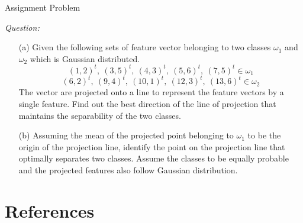 \begin{frame}{Assignment Problem}
\begin{footnotesize}
\textit{\color{mycolor2}Question:}
\begin{itemize}
\item[(a)] Given the following sets of feature vector belonging to two classes $\omega_1$ and $\omega_2$ which is Gaussian distributed.
\begin{equation}
(1,2)^t,~(3,5)^t,~(4,3)^t,~(5,6)^t, ~(7,5)^t \in \omega_1 \nonumber
\end{equation}
\begin{equation}
(6,2)^t,~(9,4)^t,~(10,1)^t,~(12,3)^t, ~(13,6)^t \in \omega_2 \nonumber
\end{equation}
The vector are projected onto a line to represent the feature vectors by a single feature. Find out the best direction of the line of projection that maintains the separability of the two classes.\\
\item[(b)] Assuming the mean of the projected point belonging to $\omega_1$ to be the origin of the projection line, identify the point on the projection line that optimally separates two classes. Assume the classes to be equally probable and the projected features also follow Gaussian distribution.
\end{itemize}
\end{footnotesize}
\end{frame}

\section{References}
